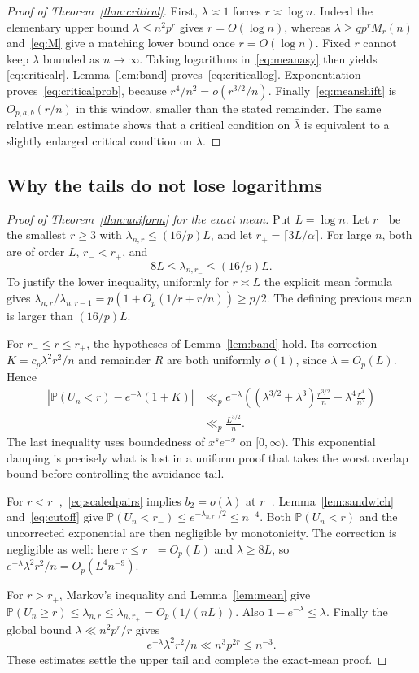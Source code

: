 \documentclass[11pt]{article}
\theoremstyle{definition}\newtheorem{definition}[theorem]{Definition}
\theoremstyle{remark}\newtheorem{remark}[theorem]{Remark}
\newcommand{\PP}{\mathbb P}
\newcommand{\la}{\lambda}
\begin{document}
\begin{proof}[Proof of Theorem~\ref{thm:critical}]
First, $\la\asymp1$ forces $r\asymp\log n$.
Indeed the elementary upper bound $\la\le n^2p^r$ gives $r=O(\log n)$,
whereas $\la\ge qp^rM_r(n)$ and~\eqref{eq:M} give a matching lower
bound once $r=O(\log n)$. Fixed $r$ cannot keep $\la$ bounded as
$n\to\infty$. Taking logarithms in~\eqref{eq:meanasy} then yields
\eqref{eq:criticalr}.
Lemma~\ref{lem:band} proves~\eqref{eq:criticallog}.
Exponentiation proves~\eqref{eq:criticalprob}, because
$r^4/n^2=o(r^{3/2}/n)$. Finally~\eqref{eq:meanshift} is $O_{p,a,b}(r/n)$
in this window, smaller than the stated remainder. The same relative
mean estimate shows that a critical condition on $\bar\la$ is equivalent
to a slightly enlarged critical condition on $\la$.
\end{proof}

\subsection{Why the tails do not lose logarithms}
\begin{proof}[Proof of Theorem~\ref{thm:uniform} for the exact mean]
Put $L=\log n$. Let $r_-$ be the smallest $r\ge3$ with
$\la_{n,r}\le(16/p)L$, and let
$r_+=\lceil3L/\alpha\rceil$. For large $n$, both are of order $L$,
$r_-<r_+$, and
\begin{equation}
 8L\le\la_{n,r_-}\le(16/p)L.\label{eq:cutoff}
\end{equation}
To justify the lower inequality, uniformly for $r\asymp L$ the explicit
mean formula gives
$\la_{n,r}/\la_{n,r-1}=p(1+O_p(1/r+r/n))\ge p/2$.
The defining previous mean is larger than $(16/p)L$.

For $r_-\le r\le r_+$, the hypotheses of Lemma~\ref{lem:band} hold.
Its correction $K=c_p\la^2r^2/n$ and remainder $R$ are both uniformly
$o(1)$, since $\la=O_p(L)$. Hence
\begin{align*}
 \left|\PP(U_n<r)-e^{-\la}(1+K)\right|
 &\ll_p e^{-\la}\left((\la^{3/2}+\la^3)\frac{r^{3/2}}n
                               +\la^4\frac{r^4}{n^2}\right)\\
 &\ll_p \frac{L^{3/2}}n.
\end{align*}
The last inequality uses boundedness of $x^s e^{-x}$ on $[0,\infty)$.
This exponential damping is precisely what is lost in a uniform proof
that takes the worst overlap bound before controlling the avoidance tail.

For $r<r_-$,~\eqref{eq:scaledpairs} implies
$b_2=o(\la)$ at $r_-$.
Lemma~\ref{lem:sandwich} and~\eqref{eq:cutoff} give
$\PP(U_n<r_-)\le e^{-\la_{n,r_-}/2}\le n^{-4}$.
Both $\PP(U_n<r)$ and the uncorrected exponential are then negligible
by monotonicity. The correction is negligible as well: here
$r\le r_-=O_p(L)$ and $\la\ge8L$, so
$e^{-\la}\la^2r^2/n=O_p(L^4n^{-9})$.

For $r>r_+$, Markov's inequality and Lemma~\ref{lem:mean} give
$\PP(U_n\ge r)\le\la_{n,r}\le\la_{n,r_+}=O_p(1/(nL))$.
Also $1-e^{-\la}\le\la$. Finally the global bound
$\la\ll n^2p^r/r$ gives
\[
 e^{-\la}\la^2r^2/n\ll n^3p^{2r}\le n^{-3}.
\]
These estimates settle the upper tail and complete the exact-mean proof.
\end{proof}
\end{document}
